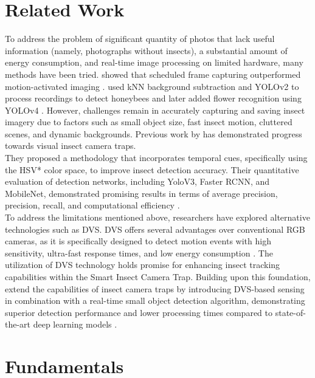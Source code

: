 \documentclass[sigchi,screen]{acmart}
\begin{document}
\section{Related Work}\label{ch02:manual}
To address the problem of significant quantity of photos that lack useful information (namely, photographs without insects), a substantial amount of energy consumption, and real-time image processing on limited hardware, many methods have been tried.
\citeauthor{naqvi2022camera} showed that scheduled frame capturing outperformed motion-activated imaging \citep{naqvi2022camera}.
\citeauthor{ratnayake2021towards} used kNN background subtraction and YOLOv2 to process recordings to detect honeybees \citep{ratnayake2021tracking} and later added flower recognition using YOLOv4 \citep{ratnayake2021towards}.
However, challenges remain in accurately capturing and saving insect imagery due to factors such as small object size, fast insect motion, cluttered scenes, and dynamic backgrounds.
Previous work by \citeauthor{thiele2021towards} has demonstrated progress towards visual insect camera traps.\\
They proposed a methodology that incorporates temporal cues, specifically using the HSV* color space, to improve insect detection accuracy. Their quantitative evaluation of detection networks, including YoloV3, Faster RCNN, and MobileNet, demonstrated promising results in terms of average precision, precision, recall, and computational efficiency \citep{thiele2021towards}.\\
To address the limitations mentioned above, researchers have explored alternative technologies such as DVS. DVS offers several advantages over conventional RGB cameras, as it is specifically designed to detect motion events with high sensitivity, ultra-fast response times, and low energy consumption \citep{delbruck2016neuromorophic}. The utilization of DVS technology holds promise for enhancing insect tracking capabilities within the Smart Insect Camera Trap. 
Building upon this foundation, \citeauthor{Gebauer_2024_WACV} extend the capabilities of insect camera traps by introducing DVS-based sensing in combination with a real-time small object detection algorithm, demonstrating superior detection performance and lower processing times compared to state-of-the-art deep learning models \citep{Gebauer_2024_WACV}.

\section{Fundamentals}
\end{document}
